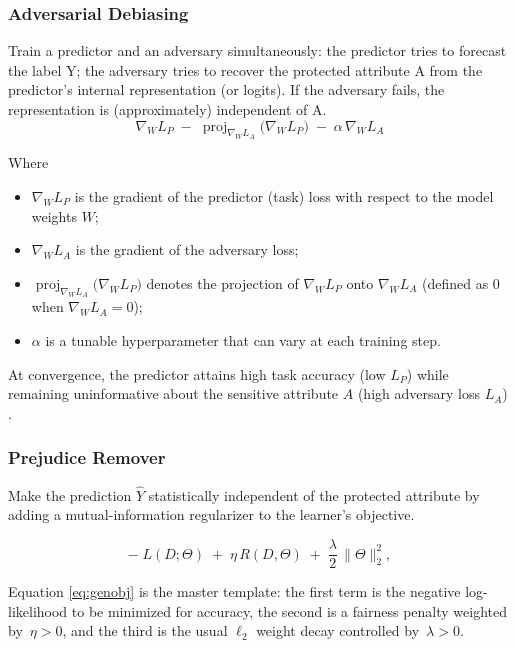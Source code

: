 \documentclass[12pt,a4paper,openright,twoside]{book}
\begin{document}
\subsubsection{Adversarial Debiasing} Train a predictor and an adversary simultaneously: the predictor tries to forecast the label Y; the adversary tries to recover the protected attribute A from the predictor’s internal representation (or logits). If the adversary fails, the representation is (approximately) independent of A.
\begin{equation}
  \nabla_W L_P
  \;-\;
  \operatorname{proj}_{\nabla_W L_A}\!\bigl(\nabla_W L_P\bigr)
  \;-\;
  \alpha\,\nabla_W L_A
\end{equation}

Where
\begin{itemize}
  \item $\nabla_W L_P$ is the gradient of the predictor (task) loss with respect to the model weights $W$;
  \item $\nabla_W L_A$ is the gradient of the adversary loss;
  \item $\operatorname{proj}_{\nabla_W L_A}\!\bigl(\nabla_W L_P\bigr)$ denotes the projection of $\nabla_W L_P$ onto $\nabla_W L_A$ (defined as $0$ when $\nabla_W L_A = 0$);
  \item $\alpha$ is a tunable hyperparameter that can vary at each training step.
\end{itemize}
At convergence, the predictor attains high task accuracy (low $L_P$) while remaining uninformative about the sensitive attribute $A$ (high adversary loss $L_A$) \cite{zhang2018mitigatingunwantedbiasesadversarial}.
\subsubsection{Prejudice Remover} Make the prediction \begin{math}\widehat{Y}\end{math} statistically independent of the protected attribute by adding a mutual-information regularizer to the learner’s objective.


\begin{equation}
-\;L(D;\Theta)\;+\;\eta\,R(D,\Theta)\;+\;
\frac{\lambda}{2}\,\lVert\Theta\rVert_{2}^{2},
\tag{7}\label{eq:genobj}
\end{equation}

\noindent
Equation \eqref{eq:genobj} is the master template: the first term is the negative log-likelihood to be minimized for accuracy, the second is a fairness penalty weighted by~\(\eta>0\), and the third is the usual \(\ell_{2}\) weight decay controlled by~\(\lambda>0\).
\end{document}
